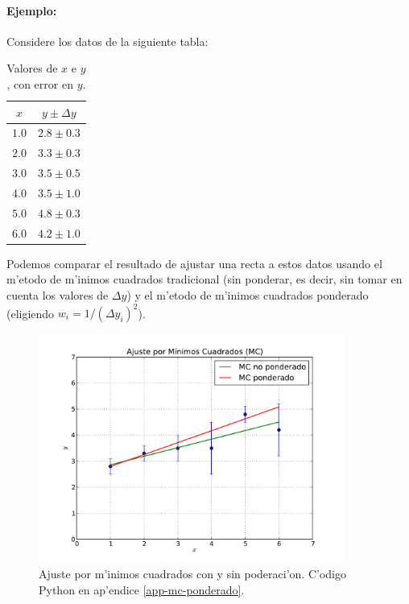 \documentclass[a4paper]{report}
\begin{document}
\paragraph{Ejemplo:} Considere los datos de la siguiente tabla:
\begin{table}[h!]
\begin{center}
\begin{tabular}{c|c}
$x$ & $y\pm\Delta y$ \\ \hline
$1.0$ & $2.8\pm 0.3$ \\ \hline 
$2.0$ & $3.3\pm 0.3$ \\ \hline
$3.0$ & $3.5\pm 0.5$ \\ \hline
$4.0$ & $3.5\pm 1.0$ \\ \hline
$5.0$ & $4.8\pm 0.3$\\ \hline
$6.0$ & $4.2\pm 1.0$ 
\end{tabular}
\caption{Valores de $x$ e $y$, con error en $y$.}
\label{tab-xyDy}
\end{center}
\end{table}
Podemos comparar el resultado de ajustar una recta a estos datos usando el m'etodo de m'inimos cuadrados tradicional (sin ponderar, es decir, sin tomar en cuenta los valores de $\Delta y$) y el m'etodo de m'inimos cuadrados ponderado (eligiendo $w_{i}=1/(\Delta y_{i})^2$).
\begin{figure}[h!]
\begin{center}
\includegraphics[width=10cm]{figs/fig-mc-ponderado.pdf}
\caption{Ajuste por m'inimos cuadrados con y sin poderaci'on. C'odigo Python en ap'endice \ref{app-mc-ponderado}.}
\end{center}
\end{figure}
\end{document}
